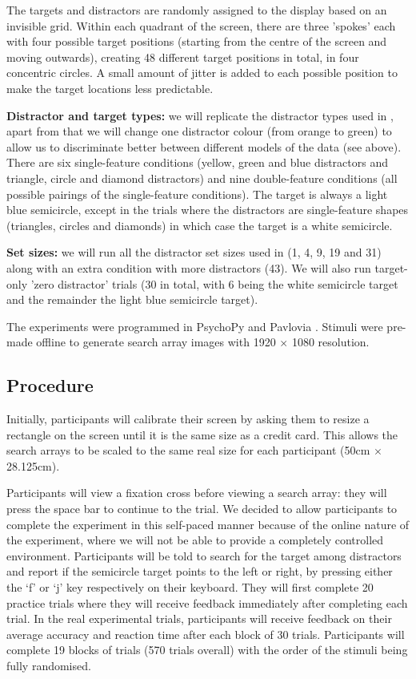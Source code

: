 \documentclass[preprint,12pt,authoryear]{elsarticle}
\begin{document}
The targets and distractors are randomly assigned to the display based on an invisible grid. Within each quadrant of the screen, there are three 'spokes' each with four possible target positions (starting from the centre of the screen and moving outwards), creating 48 different target positions in total, in four concentric circles. A small amount of jitter is added to each possible position to make the target locations less predictable.

\textbf{Distractor and target types:} we will replicate the distractor types used in \cite{buetti2019predicting}, apart from that we will change one distractor colour (from orange to green) to allow us to discriminate better between different models of the data (see above). There are six single-feature conditions (yellow, green and blue distractors and triangle, circle and diamond distractors) and nine double-feature conditions (all possible pairings of the single-feature conditions). The target is always a light blue semicircle, except in the trials where the distractors are single-feature shapes (triangles, circles and diamonds) in which case the target is a white semicircle.

\textbf{Set sizes:} we will run all the distractor set sizes used in \cite{buetti2019predicting} (1, 4, 9, 19 and 31) along with an extra condition with more distractors (43). We will also run target-only 'zero distractor' trials (30 in total, with 6 being the white semicircle target and the remainder the light blue semicircle target).

The experiments were programmed in PsychoPy and Pavlovia \citep{peirce2019psychopy2}. Stimuli were pre-made offline to generate search array images with 1920 $\times$ 1080 resolution. 

\subsection{Procedure}

Initially, participants will calibrate their screen by asking them to resize a rectangle on the screen until it is the same size as a credit card. This allows the search arrays to be scaled to the same real size for each participant (50cm $\times$ 28.125cm).

Participants will view a fixation cross before viewing a search array: they will press the space bar to continue to the trial. We decided to allow participants to complete the experiment in this self-paced manner because of the online nature of the experiment, where we will not be able to provide a completely controlled environment. Participants will be told to search for the target among distractors and report if the semicircle target points to the left or right, by pressing either the `f' or `j' key respectively on their keyboard. They will first complete 20 practice trials where they will receive feedback immediately after completing each trial. In the real experimental trials, participants will receive feedback on their average accuracy and reaction time after each block of 30 trials. Participants will complete 19 blocks of trials (570 trials overall) with the order of the stimuli being fully randomised.
 
\end{document}
